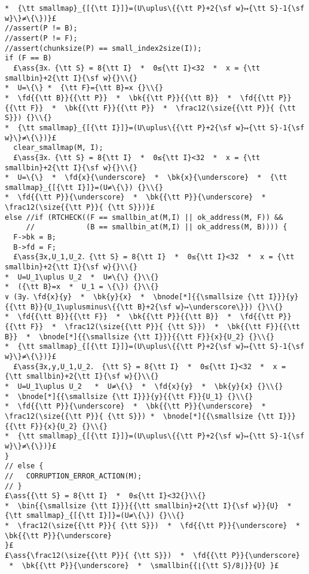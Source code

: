 \documentclass[10pt,twoside]{report}
\makeatletter
\newcommand{\ml}[2][t]{\mbox{\mdseries\begin{tabular}[#1]{@{}L@{}}#2\end{tabular}}}
\newcommand{\ass}[1]{\ensuremath{{\color{blue}\left\{\ml[c]{#1}\right\}}}}
\makeatother
\begin{document}
\begin{lstlisting}
*  {\tt smallmap}_{[{\tt I}]}=(U\uplus\{{\tt P}+2{\sf w}↦{\tt S}-1{\sf w}\}≠\{\})}£
//assert(P != B);
//assert(P != F);
//assert(chunksize(P) == small_index2size(I));
if (F == B)
  £\ass{∃x．{\tt S} = 8{\tt I}  *  0≤{\tt I}<32  *  x = {\tt smallbin}+2{\tt I}{\sf w}{}\\{}
*  U=\{\} *  {\tt F}={\tt B}=x {}\\{}
*  \fd{{\tt B}}{{\tt P}}  *  \bk{{\tt P}}{{\tt B}}  *  \fd{{\tt P}}{{\tt F}}  *  \bk{{\tt F}}{{\tt P}}  *  \frac12(\size{{\tt P}}{ {\tt S}}) {}\\{}
*  {\tt smallmap}_{[{\tt I}]}=(U\uplus\{{\tt P}+2{\sf w}↦{\tt S}-1{\sf w}\}≠\{\})}£
  clear_smallmap(M, I);
  £\ass{∃x．{\tt S} = 8{\tt I}  *  0≤{\tt I}<32  *  x = {\tt smallbin}+2{\tt I}{\sf w}{}\\{}
*  U=\{\}  *  \fd{x}{\underscore}  *  \bk{x}{\underscore}  *  {\tt smallmap}_{[{\tt I}]}=(U≠\{\}) {}\\{}
*  \fd{{\tt P}}{\underscore}  *  \bk{{\tt P}}{\underscore}  *  \frac12(\size{{\tt P}}{ {\tt S}})}£
else //if (RTCHECK((F == smallbin_at(M,I) || ok_address(M, F)) &&
     //            (B == smallbin_at(M,I) || ok_address(M, B)))) {
  F->bk = B;
  B->fd = F;
  £\ass{∃x,U_1,U_2．{\tt S} = 8{\tt I}  *  0≤{\tt I}<32  *  x = {\tt smallbin}+2{\tt I}{\sf w}{}\\{}
*  U=U_1\uplus U_2  *  U≠\{\} {}\\{}
*  ({\tt B}=x  *  U_1 = \{\}) {}\\{}
∨ (∃y．\fd{x}{y}  *  \bk{y}{x}  *  \bnode[*]{{\smallsize {\tt I}}}{y}{{\tt B}}{U_1\uplusminus\{{\tt B}+2{\sf w}↦\underscore\}}) {}\\{}
*  \fd{{\tt B}}{{\tt F}}  *  \bk{{\tt P}}{{\tt B}}  *  \fd{{\tt P}}{{\tt F}}  *  \frac12(\size{{\tt P}}{ {\tt S}})  *  \bk{{\tt F}}{{\tt B}}  *  \bnode[*]{{\smallsize {\tt I}}}{{\tt F}}{x}{U_2} {}\\{}
*  {\tt smallmap}_{[{\tt I}]}=(U\uplus\{{\tt P}+2{\sf w}↦{\tt S}-1{\sf w}\}≠\{\})}£
  £\ass{∃x,y,U_1,U_2． {\tt S} = 8{\tt I}  *  0≤{\tt I}<32  *  x = {\tt smallbin}+2{\tt I}{\sf w}{}\\{}
*  U=U_1\uplus U_2   *  U≠\{\}  *  \fd{x}{y}  *  \bk{y}{x} {}\\{}
*  \bnode[*]{{\smallsize {\tt I}}}{y}{{\tt F}}{U_1} {}\\{}
*  \fd{{\tt P}}{\underscore}  *  \bk{{\tt P}}{\underscore}  *  \frac12(\size{{\tt P}}{ {\tt S}}) *  \bnode[*]{{\smallsize {\tt I}}}{{\tt F}}{x}{U_2} {}\\{}
*  {\tt smallmap}_{[{\tt I}]}=(U\uplus\{{\tt P}+2{\sf w}↦{\tt S}-1{\sf w}\}≠\{\})}£
}
// else {
//   CORRUPTION_ERROR_ACTION(M);
// }
£\ass{{\tt S} = 8{\tt I}  *  0≤{\tt I}<32{}\\{}
*  \bin{{\smallsize {\tt I}}}{{\tt smallbin}+2{\tt I}{\sf w}}{U}  *  {\tt smallmap}_{[{\tt I}]}=(U≠\{\}) {}\\{}
*  \frac12(\size{{\tt P}}{ {\tt S}})  *  \fd{{\tt P}}{\underscore}  *  \bk{{\tt P}}{\underscore}
}£
£\ass{\frac12(\size{{\tt P}}{ {\tt S}})  *  \fd{{\tt P}}{\underscore}  *  \bk{{\tt P}}{\underscore}  *  \smallbin{{⌊{\tt S}/8⌋}}{U} }£

\end{lstlisting}
\end{document}
